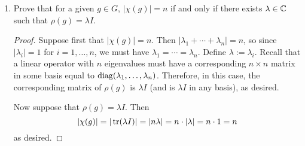 \documentclass[../psets.tex]{subfiles}
\begin{document}
\begin{enumerate}
\begin{enumerate}
\begin{proof}
            As in part (a), recall from class that every eigenvalue $\lambda_i$ of $\rho(g)$ is a root of unity. Then by the triangle inequality,
            \begin{equation*}
                |\chi(g)| = |\lambda_1+\cdots+\lambda_n| \leq |\lambda_1|+\cdots+|\lambda_n| = 1+\cdots+1 = n
            \end{equation*}
            as desired.
        \end{proof}
        \item Prove that for a given $g\in G$, $|\chi(g)|=n$ if and only if there exists $\lambda\in\mathbb{C}$ such that $\rho(g)=\lambda I$.
        \begin{proof}
            Suppose first that $|\chi(g)|=n$. Then $|\lambda_1+\cdots+\lambda_n|=n$, so since $|\lambda_i|=1$ for $i=1,\dots,n$, we must have $\lambda_1=\cdots=\lambda_n$. Define $\lambda:=\lambda_i$. Recall that a linear operator with $n$ eigenvalues must have a corresponding $n\times n$ matrix in some basis equal to $\operatorname{diag}(\lambda_1,\dots,\lambda_n)$. Therefore, in this case, the corresponding matrix of $\rho(g)$ is $\lambda I$ (and is $\lambda I$ in any basis), as desired.\par
            Now suppose that $\rho(g)=\lambda I$. Then
            \begin{equation*}
                |\chi(g)| = |\tr(\lambda I)|
                = |n\lambda|
                = n\cdot|\lambda|
                = n\cdot 1
                = n
            \end{equation*}
            as desired.
        \end{proof}
    \end{enumerate}
\end{enumerate}
\end{document}

